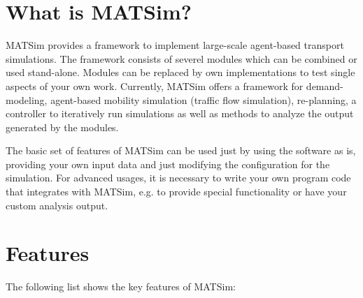  
\bigskip

\section{What is MATSim?}

MATSim provides a framework to implement large-scale agent-based transport
simulations. The framework consists of severel modules which can be combined or
used stand-alone. Modules can be replaced by own implementations to test single
aspects of your own work. Currently, MATSim offers a framework for
demand-modeling, agent-based mobility simulation (traffic flow simulation),
re-planning, a controller to iteratively run simulations as well as methods to
analyze the output generated by the modules.

The basic set of features of MATSim can be used just by using the software as
is, providing your own input data and just modifying the configuration for the
simulation. For advanced usages, it is necessary to write your own program code
that integrates with MATSim, e.g. to provide special functionality or have your
custom analysis output.


\section{Features}

The following list shows the key features of MATSim:

